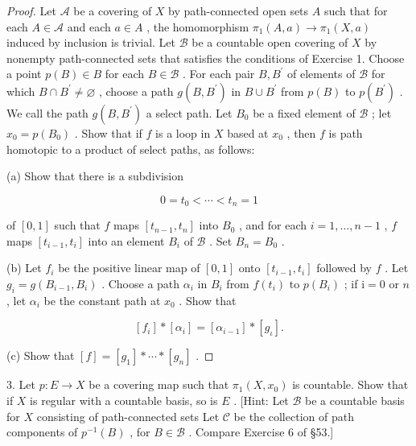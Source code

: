 \begin{proof}Let \(\mathcal{A}\) be a covering of \(X\) by path-connected open sets \(A\) such that for each \(A \in  \mathcal{A}\) and each \(a \in  A\) , the homomorphism \({\pi }_{1}\left( {A,a}\right)  \rightarrow  {\pi }_{1}\left( {X,a}\right)\) induced by inclusion is trivial. Let \(\mathcal{B}\) be a countable open covering of \(X\) by nonempty path-connected sets that satisfies the conditions of Exercise 1. Choose a point \(p\left( B\right)  \in  B\) for each \(B \in  \mathcal{B}\) . For each pair \(B,{B}^{\prime }\) of elements of \(\mathcal{B}\) for which \(B \cap  {B}^{\prime } \neq  \varnothing\) , choose a path \(g\left( {B,{B}^{\prime }}\right)\) in \(B \cup  {B}^{\prime }\) from \(p\left( B\right)\) to \(p\left( {B}^{\prime }\right)\) . We call the path \(g\left( {B,{B}^{\prime }}\right)\) a select path.
Let \({B}_{0}\) be a fixed element of \(\mathcal{B}\) ; let \({x}_{0} = p\left( {B}_{0}\right)\) . Show that if \(f\) is a loop in \(X\) based at \({x}_{0}\) , then \(f\) is path homotopic to a product of select paths, as follows:

(a) Show that there is a subdivision

\[
0 = {t}_{0} < \cdots  < {t}_{n} = 1
\]

of \(\left\lbrack  {0,1}\right\rbrack\) such that \(f\) maps \(\left\lbrack  {{t}_{n - 1},{t}_{n}}\right\rbrack\) into \({B}_{0}\) , and for each \(i = 1,\ldots ,n - 1\) , \(f\) maps \(\left\lbrack  {{t}_{i - 1},{t}_{i}}\right\rbrack\) into an element \({B}_{i}\) of \(\mathcal{B}\) . Set \({B}_{n} = {B}_{0}\) .

(b) Let \({f}_{i}\) be the positive linear map of \(\left\lbrack  {0,1}\right\rbrack\) onto \(\left\lbrack  {{t}_{i - 1},{t}_{i}}\right\rbrack\) followed by \(f\) . Let \({g}_{i} = g\left( {{B}_{i - 1},{B}_{i}}\right)\) . Choose a path \({\alpha }_{i}\) in \({B}_{i}\) from \(f\left( {t}_{i}\right)\) to \(p\left( {B}_{i}\right)\) ; if \(\mathrm{i} = 0\) or \(n\) , let \({\alpha }_{i}\) be the constant path at \({x}_{0}\) . Show that

\[
\left\lbrack  {f}_{i}\right\rbrack * \left\lbrack  {\alpha }_{i}\right\rbrack = \left\lbrack  {\alpha }_{i - 1}\right\rbrack * \left\lbrack  {g}_{\iota }\right\rbrack  .
\]

(c) Show that \(\left\lbrack  f\right\rbrack = \left\lbrack  {g}_{1}\right\rbrack * \cdots  * \left\lbrack  {g}_{n}\right\rbrack\) .
\end{proof}

3. Let \(p : E \rightarrow  X\) be a covering map such that \({\pi }_{1}\left( {X,{x}_{0}}\right)\) is countable. Show that if \(X\) is regular with a countable basis, so is \(E\) . [Hint: Let \(\mathcal{B}\) be a countable basis for \(X\) consisting of path-connected sets Let \(\mathcal{C}\) be the collection of path components of \({p}^{-1}\left( B\right)\) , for \(B \in  \mathcal{B}\) . Compare Exercise 6 of  \S 53.]

